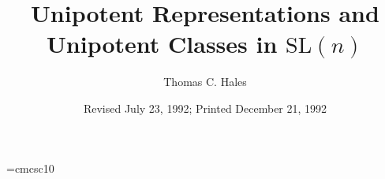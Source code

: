 \documentclass{amsart}
\begin{document}
\title{Unipotent Representations and Unipotent Classes in $\text{SL}(n)$}
\author{Thomas C. Hales}
\address{University of Chicago}
\date{Revised July 23, 1992; Printed December 21, 1992}


\parindent=8mm 
\font\smc=cmcsc10

%
%
\def\proclaim #1.{\medbreak\noindent 
  {\smc#1.\enspace}\sl} 
\def\finishproclaim {\par\rm 
  \ifdim\lastskip<\medskipamount\removelastskip 
  \penalty55\medskip\fi} 
%
%

\baselineskip=14pt
%




\end{document}
